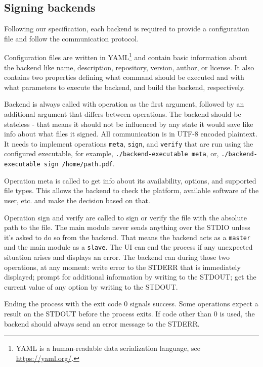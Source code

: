\documentclass[thesismargins, english, thesislinespacing, onelinechapterstyle, upjsfrontpage]{rnthesis}
\begin{document}
\subsection{Signing backends} \label{backends}

Following our specification, each backend is required to provide a configuration file and follow the communication protocol.

Configuration files are written in YAML\footnote{YAML is a human-readable data serialization language, see \url{https://yaml.org/}.} and contain basic information about the backend like name, description, repository, version, author, or license.
It also contains two properties defining what command should be executed and with what parameters to execute the backend, and build the backend, respectively.

Backend is always called with operation as the first argument, followed by an additional argument that differs between operations.
The backend should be stateless - that means it should not be influenced by any state it would save like info about what files it signed.
All communication is in UTF-8 encoded plaintext.
It needs to implement operations \texttt{meta}, \texttt{sign}, and \texttt{verify} that are run using the configured executable, for example, \texttt{./backend-executable meta}, or, \texttt{./backend-executable sign /home/path.pdf}.

Operation meta is called to get info about its availability, options, and supported file types.
This allows the backend to check the platform, available software of the user, etc. and make the decision based on that.

Operation sign and verify are called to sign or verify the file with the absolute path to the file.
The main module never sends anything over the STDIO unless it's asked to do so from the backend.
That means the backend acts as a \texttt{master} and the main module as a \texttt{slave}.
The UI can end the process if any unexpected situation arises and displays an error.
The backend can during those two operations, at any moment: write error to the STDERR that is immediately displayed; prompt for additional information by writing to the STDOUT; get the current value of any option by writing to the STDOUT.

Ending the process with the exit code 0 signals success.
Some operations expect a result on the STDOUT before the process exits.
If code other than 0 is used, the backend should always send an error message to the STDERR.
\end{document}
